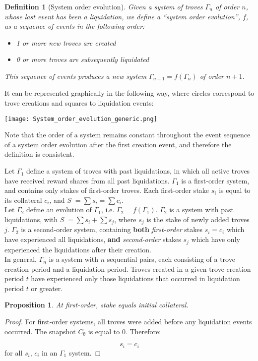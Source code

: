 \documentclass[reqno]{article}
\newtheorem{definition}{Definition}[section]
\newtheorem{proposition}[theorem]{Proposition}
\begin{document}
\begin{definition}[System order evolution]
  Given a system of troves $\Gamma_n$ of order $n$, whose last event has been a liquidation, we define a “system order evolution”, $f$, as a sequence of events in the following order:
  \begin{itemize}
  \item 1 or more new troves are created
  \item 0 or more troves are subsequently liquidated
  \end{itemize}
  This sequence of events produces a new system $\Gamma_{n+1} = f(\Gamma_n)$ of order $n+1$.
\end{definition}

It can be represented graphically in the following way, where circles correspond to trove creations and squares to liquidation events:

\texttt{[image: System\_order\_evolution\_generic.png]}

Note that the order of a system remains constant throughout the event sequence of a system order evolution after the first creation event, and therefore the definition is consistent.

\bigskip
Let $\Gamma_1$ define a system of troves with past liquidations, in which all active troves have received reward shares from all past liquidations. $\Gamma_1$ is a first-order system, and contains only stakes of first-order troves. Each first-order stake $s_i$ is equal to its collateral $c_i$, and \textit{S} $= \sum s_i = \sum c_i$.\\

Let $\Gamma_2$ define an evolution of $\Gamma_1$, i.e. $\Gamma_2 = f(\Gamma_1)$. $\Gamma_2$ is a system with past liquidations, with \textit{S} $= \sum s_i + \sum s_j$, where $s_j$ is the stake of newly added troves $j$. $\Gamma_2$ is a second-order system, containing \textbf{both} \textit{first-order} stakes $s_i = c_i$ which have experienced all liquidations, \textbf{and} \textit{second-order} stakes $s_j$ which have only experienced the liquidations after their creation.\\

In general, $\Gamma_n$ is a system with $n$ sequential pairs, each consisting of a trove creation period and a liquidation period. Troves created in a given trove creation period $t$ have experienced only those liquidations that occurred in liquidation period $t$ or greater.

\begin{proposition}
  At first-order, stake equals initial collateral.
\end{proposition}
\begin{proof}
For first-order systems, all troves were added before any liquidation events occurred. The snapshot $C_\emptyset$ is equal to 0. Therefore:

\begin{equation}
    s_i=c_i
\end{equation}
for all $s_i$, $c_i$ in an $\Gamma_1$ system.
\end{proof}
\end{document}
